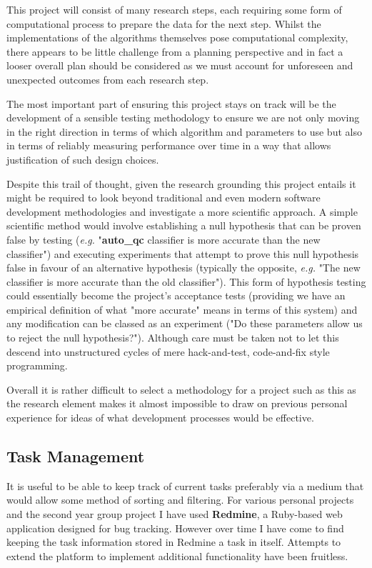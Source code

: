This project will consist of many research steps, each requiring some form of
computational process to prepare the data for the next step. Whilst the
implementations of the algorithms themselves pose computational complexity,
there appears to be little challenge from a planning perspective and in fact a
looser overall plan should be considered as we must account for unforeseen and
unexpected outcomes from each research step.

The most important part of ensuring this project stays on track will be the
development of a sensible testing methodology to ensure we are not only moving
in the right direction in terms of which algorithm and parameters to use but
also in terms of reliably measuring performance over time in a way that allows
justification of such design choices.

Despite this trail of thought, given the research grounding this project entails
it might be required to look beyond traditional and even modern software
development methodologies and investigate a more scientific approach. A simple
scientific method would involve establishing a null hypothesis that can be
proven false by testing (\textit{e.g.} "\textbf{auto\_qc} classifier is more
accurate than the new classifier") and executing experiments that
attempt to prove this null hypothesis false in favour of an alternative
hypothesis (typically the opposite, \textit{e.g.} "The new classifier is more
accurate than the old classifier"). This form of hypothesis testing
could essentially become the project's acceptance tests (providing we have an
empirical definition of what "more accurate" means in terms of this
system) and any modification can be classed as an experiment ("Do these
parameters allow us to reject the null hypothesis?").  Although care must be
taken not to let this descend into unstructured cycles of mere hack-and-test,
code-and-fix style programming.

Overall it is rather difficult to select a methodology for a project such as
this as the research element makes it almost impossible to draw on previous
personal experience for ideas of what development processes would be effective.


\subsection{Task Management}

It is useful to be able to keep track of current tasks preferably via a medium
that would allow some method of sorting and filtering. For various personal
projects and the second year group project I have used \textbf{Redmine}, a
Ruby-based web application designed for bug tracking. However over time I have
come to find keeping the task information stored in Redmine a task in itself.
Attempts to extend the platform to implement additional functionality have been
fruitless.

